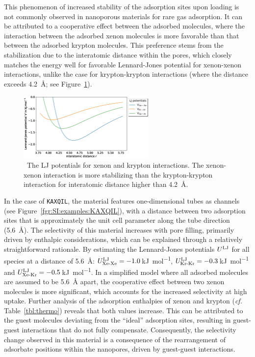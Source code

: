 \documentclass[main.tex]{subfiles}
\begin{document}
This phenomenon of increased stability of the adsorption sites upon loading is not commonly observed in nanoporous materials for rare gas adsorption. It can be attributed to a cooperative effect between the adsorbed molecules, where the interaction between the adsorbed xenon molecules is more favorable than that between the adsorbed krypton molecules. This preference stems from the stabilization due to the interatomic distance within the pores, which closely matches the energy well for favorable Lennard-Jones potential for xenon-xenon interactions, unlike the case for krypton-krypton interactions (where the distance exceeds \SI{4.2}{\angstrom}; see Figure~\ref{fgr:LJ}).

\begin{figure}[ht]
  \centering
    \includegraphics[width=0.6\textwidth]{figures/2-thermo/lennard_jones.jpg}
    \caption{\ The LJ potentials for xenon and krypton interactions. The xenon-xenon interaction is more stabilizing than the krypton-krypton interaction for interatomic distance higher than \SI{4.2}{\angstrom}.}\label{fgr:LJ}
  \end{figure}

In the case of \texttt{KAXQIL}, the material features one-dimensional tubes as channels (see Figure~\ref{fgr:SI:examples:KAXQIL}), with a distance between two adsorption sites that is approximately the unit cell parameter along the tube direction (\SI{5.6}{\angstrom}). The selectivity of this material increases with pore filling, primarily driven by enthalpic considerations, which can be explained through a relatively straightforward rationale. By estimating the Lennard-Jones potentials $U^{\text{LJ}}$ for all species at a distance of \SI{5.6}{\angstrom}: $U^{\text{LJ}}_{\text{Xe-Xe}}=-1.0$\,\si{\kilo\joule\per\mol}, $U^{\text{LJ}}_{\text{Kr-Kr}}=-0.3$\,\si{\kilo\joule\per\mol} and $U^{\text{LJ}}_{\text{Xe-Kr}}=-0.5$\,\si{\kilo\joule\per\mol}. In a simplified model where all adsorbed molecules are assumed to be \SI{5.6}{\angstrom} apart, the cooperative effect between two xenon molecules is more significant, which accounts for the increased selectivity at high uptake. Further analysis of the adsorption enthalpies of xenon and krypton (\emph{cf.} Table~\ref{tbl:thermo}) reveals that both values increase. This can be attributed to the guest molecules deviating from the ``ideal'' adsorption sites, resulting in guest-guest interactions that do not fully compensate. Consequently, the selectivity change observed in this material is a consequence of the rearrangement of adsorbate positions within the nanopores, driven by guest-guest interactions. 
\end{document}
